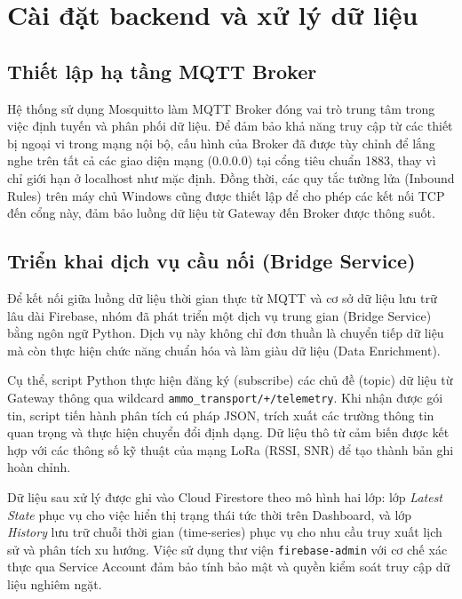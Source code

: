 \section{Cài đặt backend và xử lý dữ liệu}

\subsection{Thiết lập hạ tầng MQTT Broker}
Hệ thống sử dụng Mosquitto làm MQTT Broker đóng vai trò trung tâm trong việc định tuyến và phân phối dữ liệu. Để đảm bảo khả năng truy cập từ các thiết bị ngoại vi trong mạng nội bộ, cấu hình của Broker đã được tùy chỉnh để lắng nghe trên tất cả các giao diện mạng (0.0.0.0) tại cổng tiêu chuẩn 1883, thay vì chỉ giới hạn ở localhost như mặc định. Đồng thời, các quy tắc tường lửa (Inbound Rules) trên máy chủ Windows cũng được thiết lập để cho phép các kết nối TCP đến cổng này, đảm bảo luồng dữ liệu từ Gateway đến Broker được thông suốt.

\subsection{Triển khai dịch vụ cầu nối (Bridge Service)}
Để kết nối giữa luồng dữ liệu thời gian thực từ MQTT và cơ sở dữ liệu lưu trữ lâu dài Firebase, nhóm đã phát triển một dịch vụ trung gian (Bridge Service) bằng ngôn ngữ Python. Dịch vụ này không chỉ đơn thuần là chuyển tiếp dữ liệu mà còn thực hiện chức năng chuẩn hóa và làm giàu dữ liệu (Data Enrichment).

Cụ thể, script Python thực hiện đăng ký (subscribe) các chủ đề (topic) dữ liệu từ Gateway thông qua wildcard \texttt{ammo\_transport/+/telemetry}. Khi nhận được gói tin, script tiến hành phân tích cú pháp JSON, trích xuất các trường thông tin quan trọng và thực hiện chuyển đổi định dạng. Dữ liệu thô từ cảm biến được kết hợp với các thông số kỹ thuật của mạng LoRa (RSSI, SNR) để tạo thành bản ghi hoàn chỉnh.

Dữ liệu sau xử lý được ghi vào Cloud Firestore theo mô hình hai lớp: lớp \textit{Latest State} phục vụ cho việc hiển thị trạng thái tức thời trên Dashboard, và lớp \textit{History} lưu trữ chuỗi thời gian (time-series) phục vụ cho nhu cầu truy xuất lịch sử và phân tích xu hướng. Việc sử dụng thư viện \texttt{firebase-admin} với cơ chế xác thực qua Service Account đảm bảo tính bảo mật và quyền kiểm soát truy cập dữ liệu nghiêm ngặt.

